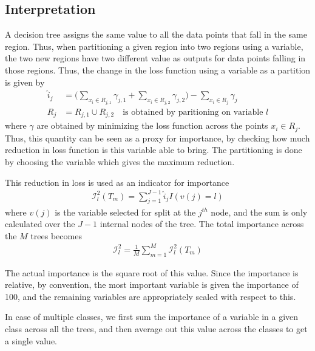 \documentclass[../statistical_learning_notes.tex]{subfiles}
\begin{document}
\subsection{Interpretation}
A decision tree assigns the same value to all the data points that fall in the same region. Thus, when partitioning a given region into two regions using a variable, the two new regions have two different value as outputs for data points falling in those regions. Thus, the change in the loss function using a variable as a partition is given by
\begin{align*}
    \hat{i}_{j} &= \big( \sum_{x_{i} \in R_{j, 1}} \gamma_{j,1} + \sum_{x_{i} \in R_{j, 2}} \gamma_{j,2} \big) - \sum_{x_{i} \in R_{j}} \gamma_{j}\\
    R_{j} &= R_{j,1} \cup R_{j,2} \quad \text{is obtained by paritioning on variable $l$}
\end{align*}
where $\gamma$ are obtained by minimizing the loss function across the points $x_{i} \in R_{j}$. Thus, this quantity can be seen as a proxy for importance, by checking how much reduction in loss function is this variable able to bring. The partitioning is done by choosing the variable which gives the maximum reduction.\newline

This reduction in loss is used as an indicator for importance
\begin{align*}
     \mathcal{I}_{l}^{2}(T_{m}) = \sum_{j=1}^{J-1} \hat{i}_{j} I(v(j) = l)
\end{align*}
where $v(j)$ is the variable selected for split at the $j^{th}$ node, and the sum is only calculated over the $J-1$ internal nodes of the tree. The total importance across the $M$ trees becomes
\begin{align*}
    \mathcal{I}_{l}^{2} = \frac{1}{M}\sum_{m=1}^{M} \mathcal{I}_{l}^{2}(T_{m})
\end{align*}

The actual importance is the square root of this value. Since the importance is relative, by convention, the most important variable is given the importance of 100, and the remaining variables are appropriately scaled with respect to this.\newline

In case of multiple classes, we first sum the importance of a variable in a given class across all the trees, and then average out this value across the classes to get a single value.
\end{document}
